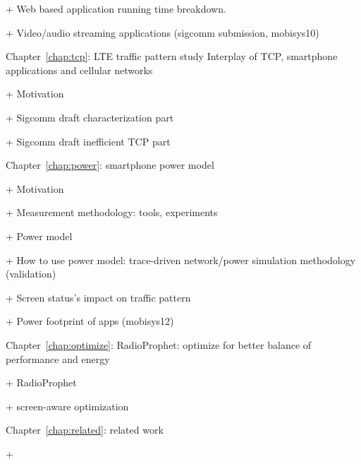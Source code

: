 	+ Web based application running time breakdown.

	+ Video/audio streaming applications (sigcomm submission, mobisys10)

	
Chapter~\ref{chap:tcp}: LTE traffic pattern study Interplay of TCP, smartphone applications and cellular networks

	+ Motivation

	+ Sigcomm draft characterization part

	+ Sigcomm draft inefficient TCP part
	
	
Chapter~\ref{chap:power}: smartphone power model

	+ Motivation

	+ Measurement methodology: tools, experiments

	+ Power model

	+ How to use power model: trace-driven network/power simulation methodology (validation)
	
	+ Screen status's impact on traffic pattern

	+ Power footprint of apps (mobisys12)
	
		
Chapter~\ref{chap:optimize}: RadioProphet: optimize for better balance of performance and energy

	+ RadioProphet

	+ screen-aware optimization
	
Chapter~\ref{chap:related}: related work

	+ 
